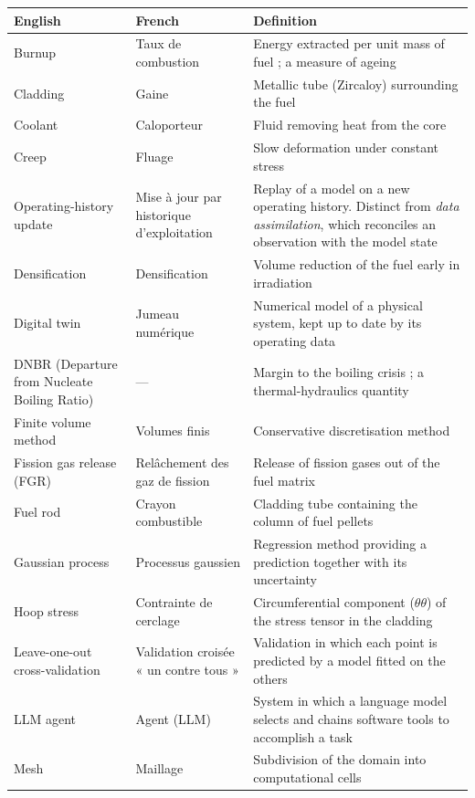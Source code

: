 \documentclass[12pt,a4paper]{report}
\begin{document}
\noindent
\begin{xltabular}{\textwidth}{@{}>{\raggedright\arraybackslash}p{4.2cm}
                     >{\raggedright\arraybackslash}p{3.1cm}
                     >{\raggedright\arraybackslash}X@{}}
\toprule
\textbf{English} & \textbf{French} & \textbf{Definition}\\
\midrule
\endhead
Burnup & Taux de combustion & Energy extracted per unit mass of fuel ; a measure
  of ageing\\
Cladding & Gaine & Metallic tube (Zircaloy) surrounding the fuel\\
Coolant & Caloporteur & Fluid removing heat from the core\\
Creep & Fluage & Slow deformation under constant stress\\
Operating-history update & Mise à jour par historique d'exploitation &
  Replay of a model on a new operating history. Distinct from \emph{data
  assimilation}, which reconciles an observation with the model state\\
Densification & Densification & Volume reduction of the fuel early in
  irradiation\\
Digital twin & Jumeau numérique & Numerical model of a physical system, kept up
  to date by its operating data\\
DNBR (Departure from Nucleate Boiling Ratio) & --- & Margin to the boiling
  crisis ; a thermal-hydraulics quantity\\
Finite volume method & Volumes finis & Conservative discretisation method\\
Fission gas release (FGR) & Relâchement des gaz de fission & Release of fission
  gases out of the fuel matrix\\
Fuel rod & Crayon combustible & Cladding tube containing the column of fuel
  pellets\\
Gaussian process & Processus gaussien & Regression method providing a prediction
  together with its uncertainty\\
Hoop stress & Contrainte de cerclage & Circumferential component
  ($\theta\theta$) of the stress tensor in the cladding\\
Leave-one-out cross-validation & Validation croisée « un contre tous » &
  Validation in which each point is predicted by a model fitted on the others\\
LLM agent & Agent (LLM) & System in which a language model selects and chains
  software tools to accomplish a task\\
Mesh & Maillage & Subdivision of the domain into computational cells\\

\end{xltabular}
\end{document}
